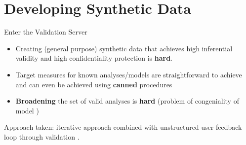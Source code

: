 
\section{Developing Synthetic Data}

\begin{frame}{Enter the Validation Server}
    \begin{itemize}
        \item Creating (general purpose) synthetic data that achieves high inferential validity and high confidentiality protection is \textbf{hard}.
        \item Target measures for known analyses/models are straightforward to achieve \citep{KinneyEtAl2011,drechsler2012,ssafinal,CreationSSBv7} and can even be achieved using \textbf{canned} procedures \citep{synthpop2016}
        \item \textbf{Broadening} the set of valid analyses is \textbf{hard} (problem of congeniality of model \citep{xiao-li-congenial})
    \end{itemize}

Approach taken: iterative approach combined with unstructured user feedback loop through validation \citep{reiterVerificationServersEnabling2009}.
\end{frame}

